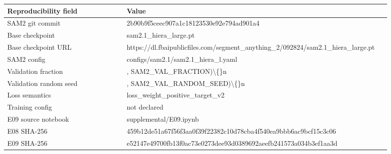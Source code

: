 \begin{tabular}{p{0.30\linewidth}p{0.62\linewidth}}
\toprule
Reproducibility field & Value \\
\midrule
SAM2 git commit & 2b90b9f5ceec907a1c18123530e92e794ad901a4 \\
Base checkpoint & sam2.1\_hiera\_large.pt \\
Base checkpoint URL & https://dl.fbaipublicfiles.com/segment\_anything\_2/092824/sam2.1\_hiera\_large.pt \\
SAM2 config & configs/sam2.1/sam2.1\_hiera\_l.yaml \\
Validation fraction & , SAM2\_VAL\_FRACTION)\textbackslash\{\}n \\
Validation random seed & , SAM2\_VAL\_RANDOM\_SEED)\textbackslash\{\}n \\
Loss semantics & loss\_weight\_positive\_target\_v2 \\
Training config & not declared \\
E09 source notebook & supplemental/E09.ipynb \\
E08 SHA-256 & 459b12de51a67f56f3aa0f39f22382c10d78cba4f540ea9bbb6ac9bcf15c3c06 \\
E09 SHA-256 & e52147e49700fb13f0ac73e0273dee93d0389692aeefb241573a034b3ef1aa3d \\
\bottomrule
\end{tabular}
